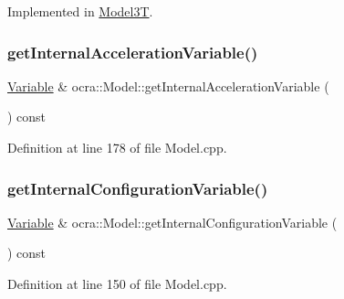 Implemented in \hyperlink{classModel3T_a25860bdbf24d115cc7dafe75cc7a8197}{Model3T}.

\hypertarget{classocra_1_1Model_a4a95124245b13fe015c1a487dcbb8868}{}\label{classocra_1_1Model_a4a95124245b13fe015c1a487dcbb8868} 
\subsubsection{\texorpdfstring{get\+Internal\+Acceleration\+Variable()}{getInternalAccelerationVariable()}}
{\footnotesize\ttfamily \hyperlink{classocra_1_1Variable}{Variable} \& ocra\+::\+Model\+::get\+Internal\+Acceleration\+Variable (\begin{DoxyParamCaption}{ }\end{DoxyParamCaption}) const}



Definition at line 178 of file Model.\+cpp.

\hypertarget{classocra_1_1Model_a6c660297f1bd8c07c93829fc8a28838a}{}\label{classocra_1_1Model_a6c660297f1bd8c07c93829fc8a28838a} 
\subsubsection{\texorpdfstring{get\+Internal\+Configuration\+Variable()}{getInternalConfigurationVariable()}}
{\footnotesize\ttfamily \hyperlink{classocra_1_1Variable}{Variable} \& ocra\+::\+Model\+::get\+Internal\+Configuration\+Variable (\begin{DoxyParamCaption}{ }\end{DoxyParamCaption}) const}



Definition at line 150 of file Model.\+cpp.

\hypertarget{classocra_1_1Model_ae690f2e3d9822b3c192393add7af60a3}{}\label{classocra_1_1Model_ae690f2e3d9822b3c192393add7af60a3} 
